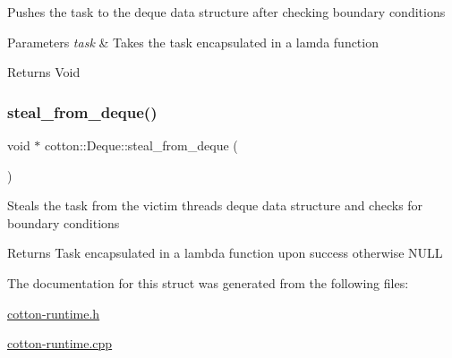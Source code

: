 Pushes the task to the deque data structure after checking boundary conditions


\begin{DoxyParams}{Parameters}
{\em task} & Takes the task encapsulated in a lamda function \\
\hline
\end{DoxyParams}
\begin{DoxyReturn}{Returns}
Void 
\end{DoxyReturn}
\mbox{\label{structcotton_1_1Deque_a33215b0b811484e2af94f2db16a5c15c}} 
\subsubsection{\texorpdfstring{steal\+\_\+from\+\_\+deque()}{steal\_from\_deque()}}
{\footnotesize\ttfamily void $\ast$ cotton\+::\+Deque\+::steal\+\_\+from\+\_\+deque (\begin{DoxyParamCaption}{ }\end{DoxyParamCaption})}

Steals the task from the victim thread\textquotesingle{}s deque data structure and checks for boundary conditions

\begin{DoxyReturn}{Returns}
Task encapsulated in a lambda function upon success otherwise N\+U\+LL 
\end{DoxyReturn}


The documentation for this struct was generated from the following files\+:\begin{DoxyCompactItemize}
\item 
\mbox{\hyperlink{cotton-runtime_8h}{cotton-\/runtime.\+h}}\item 
\mbox{\hyperlink{cotton-runtime_8cpp}{cotton-\/runtime.\+cpp}}\end{DoxyCompactItemize}
